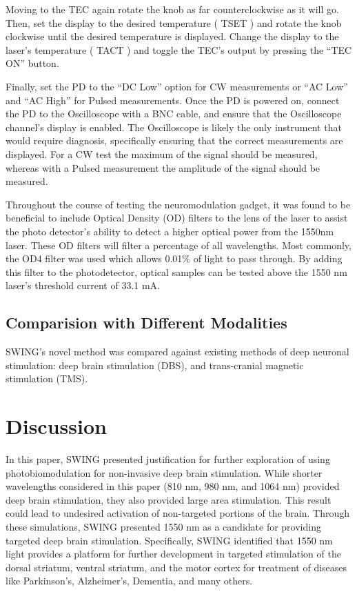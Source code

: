 \documentclass[journal,twoside,web]{ieeecolor}
\begin{document}
Moving to the TEC again rotate the knob as far counterclockwise as it will go. Then, set the display to the desired temperature (
TSET 
) and rotate the knob clockwise until the desired temperature is displayed. Change the display to the laser’s temperature (
TACT 
) and toggle the TEC’s output by pressing the “TEC ON” button. 

Finally, set the PD to the “DC Low” option for CW measurements or “AC Low” and “AC High” for Pulsed measurements. Once the PD is powered on, connect the PD to the Oscilloscope with a BNC cable, and ensure that the Oscilloscope channel’s display is enabled. The Oscilloscope is likely the only instrument that would require diagnosis, specifically ensuring that the correct measurements are displayed. For a CW test the maximum of the signal should be measured, whereas with a Pulsed measurement the amplitude of the signal should be measured. 

Throughout the course of testing the neuromodulation gadget, it was found to be beneficial to include Optical Density (OD) filters to the lens of the laser to assist the photo detector's ability to detect a higher optical power from the 1550nm laser. These OD filters will filter a percentage of all wavelengths. Most commonly, the OD4 filter was used which allows 0.01\% of light to pass through. By adding this filter to the photodetector, optical samples can be tested above the 1550 nm laser’s threshold current of 33.1 mA. 

\subsection{Comparision with Different Modalities}
SWING's novel method was compared against existing methods of deep neuronal stimulation: deep brain stimulation (DBS), and trans-cranial magnetic stimulation (TMS). 



\section{Discussion}
\label{sec:next steps}
In this paper, SWING presented justification for further exploration of using photobiomodulation for non-invasive deep brain stimulation. While 
shorter wavelengths considered in this paper (810 nm, 980 nm, and 1064 nm) provided deep brain stimulation, they also provided large area stimulation. 
This result could lead to undesired activation of non-targeted portions of the brain. Through these simulations, SWING presented 1550 nm as a candidate for 
providing targeted deep brain stimulation. Specifically, SWING identified that 1550 nm light provides a platform for further development in targeted 
stimulation of the dorsal striatum, ventral striatum, and the motor cortex for treatment of diseases like Parkinson's, Alzheimer's, Dementia, and many others.
\end{document}
